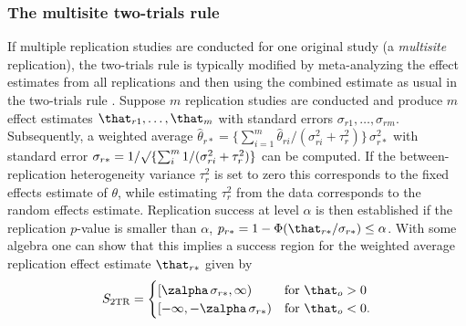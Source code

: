 \begin{subappendices}
\subsubsection{The multisite two-trials rule}
If multiple replication studies are conducted for one original study (a
\emph{multisite} replication), the two-trials rule is typically modified by
meta-analyzing the effect estimates from all replications and then using the
combined estimate as usual in the two-trials rule \citep[see \eg{} the ``Many
labs'' projects from][]{Klein2014, Klein2018}. Suppose $m$ replication studies
are conducted and produce $m$ effect estimates $\that_{r1}, \dots, \that_{m}$
with standard errors $\sigma_{r1}, \dots, \sigma_{rm}$. Subsequently, a weighted
average
$\hat{\theta}_{r*} = \{\sum_{i = 1}^{m} \hat{\theta}_{ri}/(\sigma^{2}_{ri} + \tau^{2}_{r})\}\,\sigma_{r*}^{2}$
with standard error
\mbox{$\sigma_{r*} = 1/\surd\{\sum_{i}^{m}1/(\sigma^{2}_{ri} + \tau^{2}_{r})\}$}
can be computed. If the between-replication heterogeneity variance
$\tau^{2}_{r}$ is set to zero this corresponds to the fixed effects estimate of
$\theta$, while estimating $\tau^{2}_{r}$ from the data corresponds to the
random effects estimate. Replication success at level $\alpha$ is then
established if the replication $p$-value is smaller than $\alpha$, \ie{}
$p_{r*} = 1 - \Phi(\that_{r*}/\sigma_{r*}) \leq \alpha$. With some algebra one
can show that this implies a success region for the weighted average replication
effect estimate $\that_{r*}$ given by
\begin{align*}
  S_{\text{2TR}} =
  \begin{cases}
    \left[\zalpha \, \sigma_{r*}, \infty \right) & \text{for} ~ \that_{o} > 0 \\
    \left[-\infty, -\zalpha \, \sigma_{r*} \right) & \text{for} ~ \that_{o} < 0.
  \end{cases}
\end{align*}


\end{subappendices}
